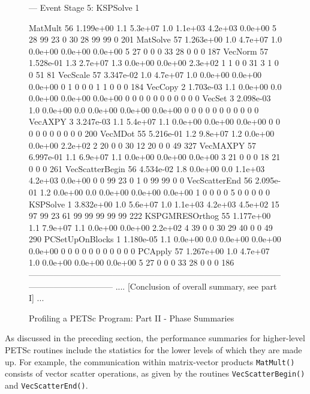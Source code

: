 \begin{figure}[tb]
\begin{outputlisting}[\tiny\ttfamily]
--- Event Stage 5: KSPSolve 1

MatMult               56  1.199e+00   1.1  5.3e+07   1.0  1.1e+03 4.2e+03 0.0e+00  5 28 99 23  0  30 28 99 99  0   201
MatSolve              57  1.263e+00   1.0  4.7e+07   1.0  0.0e+00 0.0e+00 0.0e+00  5 27  0  0  0  33 28  0  0  0   187
VecNorm               57  1.528e-01   1.3  2.7e+07   1.3  0.0e+00 0.0e+00 2.3e+02  1  1  0  0 31   3  1  0  0 51    81
VecScale              57  3.347e-02   1.0  4.7e+07   1.0  0.0e+00 0.0e+00 0.0e+00  0  1  0  0  0   1  1  0  0  0   184
VecCopy                2  1.703e-03   1.1  0.0e+00   0.0  0.0e+00 0.0e+00 0.0e+00  0  0  0  0  0   0  0  0  0  0     0
VecSet                 3  2.098e-03   1.0  0.0e+00   0.0  0.0e+00 0.0e+00 0.0e+00  0  0  0  0  0   0  0  0  0  0     0
VecAXPY                3  3.247e-03   1.1  5.4e+07   1.1  0.0e+00 0.0e+00 0.0e+00  0  0  0  0  0   0  0  0  0  0   200
VecMDot               55  5.216e-01   1.2  9.8e+07   1.2  0.0e+00 0.0e+00 2.2e+02  2 20  0  0 30  12 20  0  0 49   327
VecMAXPY              57  6.997e-01   1.1  6.9e+07   1.1  0.0e+00 0.0e+00 0.0e+00  3 21  0  0  0  18 21  0  0  0   261
VecScatterBegin       56  4.534e-02   1.8  0.0e+00   0.0  1.1e+03 4.2e+03 0.0e+00  0  0 99 23  0   1  0 99 99  0     0
VecScatterEnd         56  2.095e-01   1.2  0.0e+00   0.0  0.0e+00 0.0e+00 0.0e+00  1  0  0  0  0   5  0  0  0  0     0
KSPSolve               1  3.832e+00   1.0  5.6e+07   1.0  1.1e+03 4.2e+03 4.5e+02 15 97 99 23 61  99 99 99 99 99   222
KSPGMRESOrthog        55  1.177e+00   1.1  7.9e+07   1.1  0.0e+00 0.0e+00 2.2e+02  4 39  0  0 30  29 40  0  0 49   290
PCSetUpOnBlocks        1  1.180e-05   1.1  0.0e+00   0.0  0.0e+00 0.0e+00 0.0e+00  0  0  0  0  0   0  0  0  0  0     0
PCApply               57  1.267e+00   1.0  4.7e+07   1.0  0.0e+00 0.0e+00 0.0e+00  5 27  0  0  0  33 28  0  0  0   186
------------------------------------------------------------------------------------------------------------------------
.... [Conclusion of overall summary, see part I] ...
\end{outputlisting}
\caption{Profiling a PETSc Program: Part II - Phase Summaries}
\label{fig_exparprof2}
\end{figure}

As discussed in the preceding section, the performance summaries for
higher-level PETSc routines include the statistics for the lower
levels of which they are made up.  For example, the communication within
matrix-vector products \lstinline{MatMult()} consists of vector scatter
operations, as given by the routines \lstinline{VecScatterBegin()} and \lstinline{VecScatterEnd()}.
%
%

